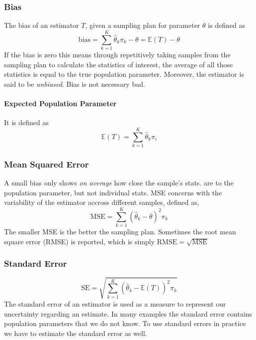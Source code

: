 \subsubsection{Bias}
The bias of an estimator $T$, given a sampling plan for parameter $\theta$ is defined as
\begin{equation}
    \mathrm{bias}=\sum_{k=1}^{K}\hat{\theta}_k\pi_k-\theta=\mathbb{E}(T)-\theta
\end{equation}
If the bias is zero this means through repetitively taking samples from the sampling plan to calculate the statistics of interest, the average of all those statistics is equal to the true population parameter. Moreover,
the estimator is said to be \emph{unbiased}. Bias is not necessary bad.
\paragraph{Expected Population Parameter}
It is defined as 
\begin{equation}
    \mathbb{E}(T)=\sum_{k=1}^{K}\hat{\theta}_k\pi_i 
\end{equation}

\subsubsection{Mean Squared Error}
A small bias only shows \emph{on average} how close the sample's stats. are to the population parameter, but not individual stats. MSE concerns with the variability of the estimator accross different samples, defined as,
\begin{equation}
    \mathrm{MSE}=\sum_{k=1}^{K}\left(\hat{\theta}_k-\theta\right)^2\pi_k
\end{equation}
The smaller MSE is the better the sampling plan. Sometimes the root mean square error (RMSE) is reported, which is simply $\mathrm{RMSE}=\sqrt{\mathrm{MSE}}$

\subsubsection{Standard Error}
\begin{equation}
    \mathrm{SE}=\sqrt{\sum_{k=1}^{K}\left(\hat{\theta}_k-\mathbb{E}(T)\right)^2\pi_k}
\end{equation}
The standard error of an estimator is used as a measure to represent our uncertainty regarding an estimate. In many examples the standard error contains population parameters that we do not know. To use standard errors 
in practice we have to estimate the standard error as well.

